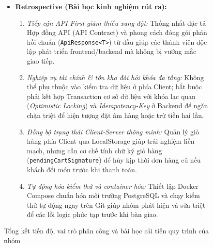 \begin{figure}[H]
\begin{tcolorbox}[colback=gray!5,colframe=gray!50,title=Ghi nhận tiến độ và số liệu thực tế của Nhóm]
\begin{itemize}[leftmargin=1.5cm]
  \item \textbf{Retrospective (Bài học kinh nghiệm rút ra):}
  \begin{enumerate}[label=\alph*),leftmargin=0.8cm]
    \item \textit{Tiếp cận API-First giảm thiểu xung đột:} Thống nhất đặc tả Hợp đồng API (API Contract) và phong cách đóng gói phản hồi chuẩn (\texttt{ApiResponse<T>}) từ đầu giúp các thành viên độc lập phát triển frontend/backend mà không bị vướng mắc giao tiếp.
    \item \textit{Nghiệp vụ tài chính \& tồn kho đòi hỏi khóa đa tầng:} Không thể phụ thuộc vào kiểm tra dữ liệu ở phía Client; bắt buộc phải kết hợp Transaction cơ sở dữ liệu với khóa lạc quan (\textit{Optimistic Locking}) và \textit{Idempotency-Key} ở Backend để ngăn chặn triệt để hiện tượng đặt âm hàng hoặc trừ tiền hai lần.
    \item \textit{Đồng bộ trạng thái Client-Server thông minh:} Quản lý giỏ hàng phía Client qua LocalStorage giúp trải nghiệm liền mạch, nhưng cần cơ chế tính chữ ký giỏ hàng (\texttt{pendingCartSignature}) để hủy kịp thời đơn hàng cũ nếu khách đổi món trước khi thanh toán.
    \item \textit{Tự động hóa kiểm thử và container hóa:} Thiết lập Docker Compose chuẩn hóa môi trường PostgreSQL và chạy kiểm thử tự động ngay trên Git giúp nhóm phát hiện và sửa triệt để các lỗi logic phức tạp trước khi bàn giao.
  \end{enumerate}
\end{itemize}
\end{tcolorbox}
\caption{Tổng kết tiến độ, vai trò phân công và bài học cải tiến quy trình của nhóm}
\label{fig:team-progress-metrics}
\end{figure}
